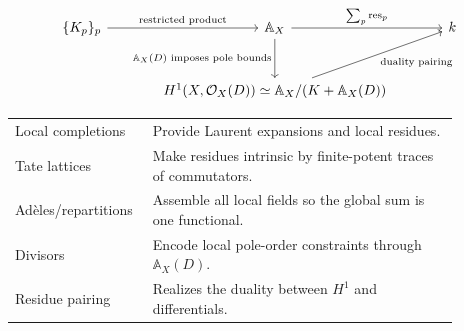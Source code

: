 \documentclass[11pt,a4paper]{article}
\newcommand{\OO}{\mathcal O}
\newcommand{\AX}{\mathbb A_X}
\newcommand{\res}{\operatorname{res}}
\theoremstyle{definition}
\theoremstyle{plain}
\theoremstyle{remark}
\begin{document}
\[
\begin{tikzcd}[column sep=large,row sep=large]
\{K_p\}_p \arrow[r,"\text{restricted product}"]
& \AX \arrow[r,"\sum_p\res_p"] \arrow[d,"\AX(D)\text{ imposes pole bounds}"']
& k \\
& H^1(X,\OO_X(D))\simeq \AX/(K+\AX(D)) \arrow[ur,"\text{duality pairing}"'] &
\end{tikzcd}
\]

\begin{center}
\small
\begin{tabular}{L{0.23\linewidth}L{0.65\linewidth}}
\toprule
Local completions & Provide Laurent expansions and local residues. \\
Tate lattices & Make residues intrinsic by finite-potent traces of commutators. \\
Adèles/repartitions & Assemble all local fields so the global sum is one functional. \\
Divisors & Encode local pole-order constraints through $\AX(D)$. \\
Residue pairing & Realizes the duality between $H^1$ and differentials. \\
\bottomrule
\end{tabular}
\end{center}
\end{document}

